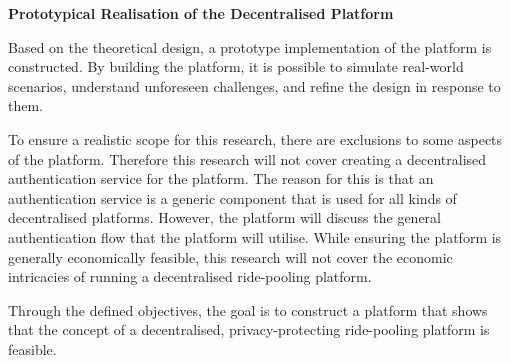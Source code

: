 \textbf{Prototypical Realisation of the Decentralised Platform}

Based on the theoretical design, a prototype implementation of the platform is constructed. By building the platform,  it is possible to simulate real-world scenarios, understand unforeseen challenges, and refine the design in response to them.

To ensure a realistic scope for this research, there are exclusions to some aspects of the platform. Therefore this research will not cover creating a decentralised authentication service for the platform. The reason for this is that an authentication service is a generic component that is used for all kinds of decentralised platforms. However, the platform will discuss the general authentication flow that the platform will utilise. While ensuring the platform is generally economically feasible, this research will not cover the economic intricacies of running a decentralised ride-pooling platform.

 Through the defined objectives, the goal is to construct a platform that shows that the concept of a decentralised, privacy-protecting ride-pooling platform is feasible.